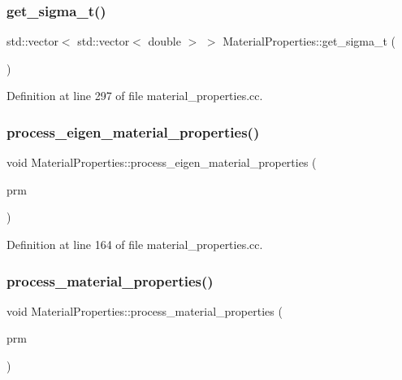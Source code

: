 \subsubsection{\texorpdfstring{get\+\_\+sigma\+\_\+t()}{get\_sigma\_t()}}
{\footnotesize\ttfamily std\+::vector$<$ std\+::vector$<$ double $>$ $>$ Material\+Properties\+::get\+\_\+sigma\+\_\+t (\begin{DoxyParamCaption}{ }\end{DoxyParamCaption})}



Definition at line 297 of file material\+\_\+properties.\+cc.

\mbox{\label{class_material_properties_a2a25d8392fb1002f27e048d40f37d627}} 
\subsubsection{\texorpdfstring{process\+\_\+eigen\+\_\+material\+\_\+properties()}{process\_eigen\_material\_properties()}}
{\footnotesize\ttfamily void Material\+Properties\+::process\+\_\+eigen\+\_\+material\+\_\+properties (\begin{DoxyParamCaption}\item[{Parameter\+Handler \&}]{prm }\end{DoxyParamCaption})\hspace{0.3cm}{\ttfamily [private]}}



Definition at line 164 of file material\+\_\+properties.\+cc.

\mbox{\label{class_material_properties_a83121d60325c02dbce98968b45134993}} 
\subsubsection{\texorpdfstring{process\+\_\+material\+\_\+properties()}{process\_material\_properties()}}
{\footnotesize\ttfamily void Material\+Properties\+::process\+\_\+material\+\_\+properties (\begin{DoxyParamCaption}\item[{Parameter\+Handler \&}]{prm }\end{DoxyParamCaption})\hspace{0.3cm}{\ttfamily [private]}}



